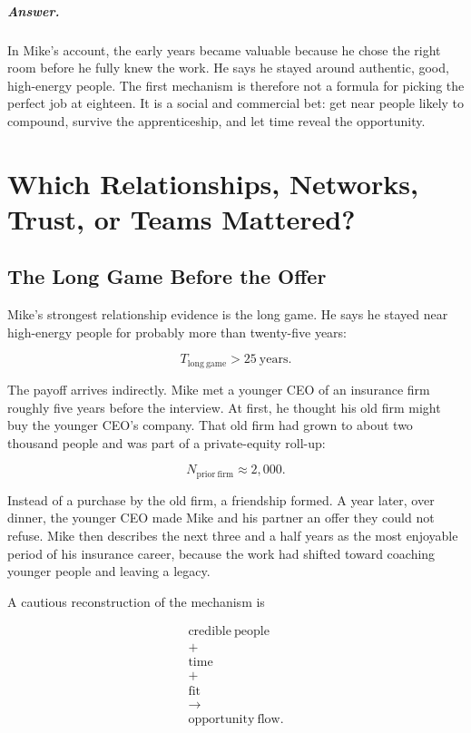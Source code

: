 \documentclass[11pt,oneside]{book}
\begin{document}
\paragraph{Answer.}
In Mike's account, the early years became valuable because he chose the right room before he fully knew the work. He says he stayed around authentic, good, high-energy people. The first mechanism is therefore not a formula for picking the perfect job at eighteen. It is a social and commercial bet: get near people likely to compound, survive the apprenticeship, and let time reveal the opportunity.

\chapter{Which Relationships, Networks, Trust, or Teams Mattered?}

\section{The Long Game Before the Offer}

Mike's strongest relationship evidence is the long game. He says he stayed near high-energy people for probably more than twenty-five years:

\begin{equation}
T_{\mathrm{long\ game}}>25\ \mathrm{years}.
\end{equation}

The payoff arrives indirectly. Mike met a younger CEO of an insurance firm roughly five years before the interview. At first, he thought his old firm might buy the younger CEO's company. That old firm had grown to about two thousand people and was part of a private-equity roll-up:

\begin{equation}
N_{\mathrm{prior\ firm}}\approx 2{,}000.
\end{equation}

Instead of a purchase by the old firm, a friendship formed. A year later, over dinner, the younger CEO made Mike and his partner an offer they could not refuse. Mike then describes the next three and a half years as the most enjoyable period of his insurance career, because the work had shifted toward coaching younger people and leaving a legacy.

A cautious reconstruction of the mechanism is

\begin{equation}
\begin{gathered}
\mathrm{credible\ people}\\
+\\
\mathrm{time}\\
+\\
\mathrm{fit}\\
\longrightarrow\\
\mathrm{opportunity\ flow}.
\end{gathered}
\end{equation}
\end{document}
